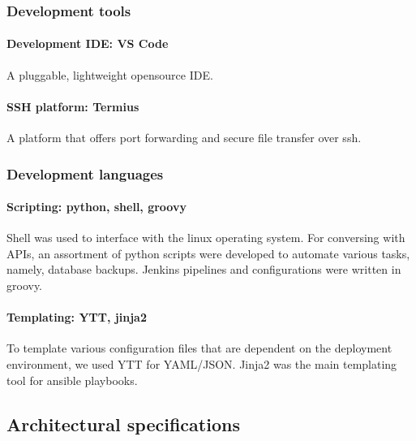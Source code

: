 \subsubsection{Development tools }

\paragraph{Development IDE: VS Code }

\hspace{7mm}A pluggable, lightweight opensource IDE. 

\paragraph{SSH platform: Termius }

\hspace{7mm}A platform that offers port forwarding and secure file transfer over ssh. 

\subsubsection{Development languages }

\paragraph{Scripting: python\cite{Python}, shell, groovy\cite{Groovy} }

\hspace{7mm}Shell was used to interface with the linux operating system. For conversing with APIs, an assortment of python scripts were developed to automate various tasks, namely, database backups. Jenkins pipelines and configurations were written in groovy. 

\paragraph{Templating: YTT\cite{YTT}, jinja2\cite{Jinja2} }

\hspace{7mm}To template various configuration files that are dependent on the deployment environment, we used YTT for YAML/JSON. Jinja2 was the main templating tool for ansible playbooks. 

\newpage

\subsection{Architectural specifications}

